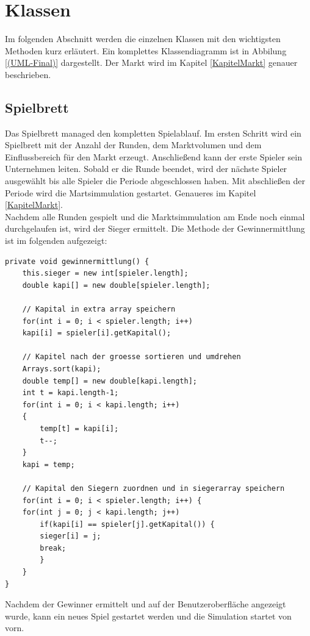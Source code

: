 \newpage
\section{Klassen}
Im folgenden Abschnitt werden die einzelnen Klassen mit den wichtigsten Methoden kurz erläutert. Ein komplettes Klassendiagramm ist in Abbilung \ref{(UML-Final)} dargestellt. Der Markt wird im Kapitel \ref{KapitelMarkt} genauer beschrieben.

\subsection{Spielbrett}
Das Spielbrett managed den kompletten Spielablauf. Im ersten Schritt wird ein Spielbrett mit der Anzahl der Runden, dem Marktvolumen und dem Einflussbereich für den Markt erzeugt. Anschließend kann der erste Spieler sein Unternehmen leiten. Sobald er die Runde beendet, wird der nächste Spieler ausgewählt bis alle Spieler die Periode abgeschlossen haben. Mit abschließen der Periode wird die Martsimmulation gestartet. Genaueres im Kapitel \ref{KapitelMarkt}. \\
Nachdem alle Runden gespielt und die Marktsimmulation am Ende noch einmal durchgelaufen ist, wird der Sieger ermittelt. Die Methode der Gewinnermittlung ist im folgenden aufgezeigt: \\

\lstset{language=Java} 
\begin{lstlisting}
private void gewinnermittlung() {
	this.sieger = new int[spieler.length];
	double kapi[] = new double[spieler.length];
	
	// Kapital in extra array speichern
	for(int i = 0; i < spieler.length; i++)
	kapi[i] = spieler[i].getKapital();
	
	// Kapitel nach der groesse sortieren und umdrehen		
	Arrays.sort(kapi);
	double temp[] = new double[kapi.length];
	int t = kapi.length-1;
	for(int i = 0; i < kapi.length; i++)
	{
		temp[t] = kapi[i];
		t--;
	}
	kapi = temp;
	
	// Kapital den Siegern zuordnen und in siegerarray speichern
	for(int i = 0; i < spieler.length; i++) {
	for(int j = 0; j < kapi.length; j++)
		if(kapi[i] == spieler[j].getKapital()) {
		sieger[i] = j;
		break;
		}
	}
}
\end{lstlisting}

Nachdem der Gewinner ermittelt und auf der Benutzeroberfläche angezeigt wurde, kann ein neues Spiel gestartet werden und die Simulation startet von vorn.



